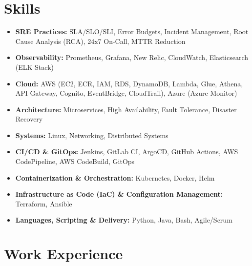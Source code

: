 \documentclass[a4paper,10.999999pt]{article}
\begin{document}
    \section{Skills}
    \begin{itemize}[leftmargin=1.35em, itemsep=0.35pt, topsep=0.3pt, parsep=0pt, label=\raisebox{0.25ex}{\tiny$\circ$}]
    \item \textbf{SRE Practices:} SLA/SLO/SLI, Error Budgets, Incident Management, Root Cause Analysis (RCA), 24x7 On-Call, MTTR Reduction
    \item \textbf{Observability:} Prometheus, Grafana, New Relic, CloudWatch, Elasticsearch (ELK Stack)
    \item \textbf{Cloud:} AWS (EC2, ECR, IAM, RDS, DynamoDB, Lambda, Glue, Athena, API Gateway, Cognito, EventBridge, CloudTrail), Azure (Azure Monitor)
    \item \textbf{Architecture:} Microservices, High Availability, Fault Tolerance, Disaster Recovery
    \item \textbf{Systems:} Linux, Networking, Distributed Systems
    \item \textbf{CI/CD \& GitOps:} Jenkins, GitLab CI, ArgoCD, GitHub Actions, AWS CodePipeline, AWS CodeBuild, GitOps
    \item \textbf{Containerization \& Orchestration:} Kubernetes, Docker, Helm
    \item \textbf{Infrastructure as Code (IaC) \& Configuration Management:} Terraform, Ansible
    \item \textbf{Languages, Scripting \& Delivery:} Python, Java, Bash, Agile/Scrum
    \end{itemize}


    \section{Work Experience}
\end{document}

